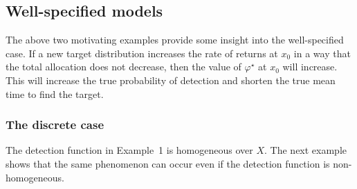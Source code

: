 \documentclass[12pt]{article}
\theoremstyle{plain}
\theoremstyle{definition}
\theoremstyle{remark}
\begin{document}
%
\subsection{Well-specified models}

The above two motivating examples provide some insight into the well-specified case.  If a new target distribution increases the rate of returns at $x_0$ in a way that the total allocation does not decrease,  then the value of $\varphi^\star$ at $x_0$ will increase. This will increase the true probability of detection and shorten the true mean time to find the target. 

\subsubsection{The discrete case}

The detection function in Example~1 is homogeneous over $X$. The next example shows that the same phenomenon can occur even if the detection function is non-homogeneous.
\end{document}
